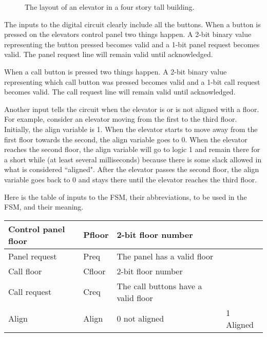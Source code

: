 \begin{enumerate}
        \begin{figure}[ht]
            \caption{The layout of an elevator in a four story tall building.}
            \label{fig:elevator}
        \end{figure}

        The inputs to the digital circuit clearly include all the buttons.
        When a button is pressed on the elevators control panel two things
        happen.  A 2-bit binary value representing the button pressed
        becomes valid and a 1-bit panel request becomes valid.  The
        panel request line will remain valid until acknowledged.

        When a call button is pressed two things happen.  A 2-bit binary value
        representing which call button was pressed becomes valid and a 1-bit
        call request becomes valid.  The call request line will remain valid
        until acknowledged.

        Another input tells the circuit when the
        elevator is or is not aligned with a floor.  For example, consider
        an elevator moving from the first to the third floor.  Initially, the
        align variable is 1.  When the elevator starts
        to move away from the first floor towards the second, the align
        variable goes to 0.  When the elevator reaches the second floor, the
        align variable will go to logic 1 and remain there for a short
        while (at least several milliseconds) because there is some
        slack allowed in what is considered ``aligned".  After the elevator
        passes the second floor, the align variable goes back to 0 and stays
        there until the elevator reaches the third floor.

        Here is the table of inputs to the FSM, their abbreviations, to be
        used in the FSM, and their meaning.

        \begin{tabular}{|l|l||l|l|} \hline
            Control panel floor     & Pfloor        & 2-bit floor number & \\ \hline
            Panel request           & Preq          & The panel has a valid floor & \\ \hline
            Call floor              & Cfloor        & 2-bit floor number & \\ \hline
            Call request            & Creq          & The call buttons have a valid floor & \\ \hline
            Align                   & Align         & 0 not aligned & 1 Aligned \\ \hline
        \end{tabular}


\end{enumerate}
